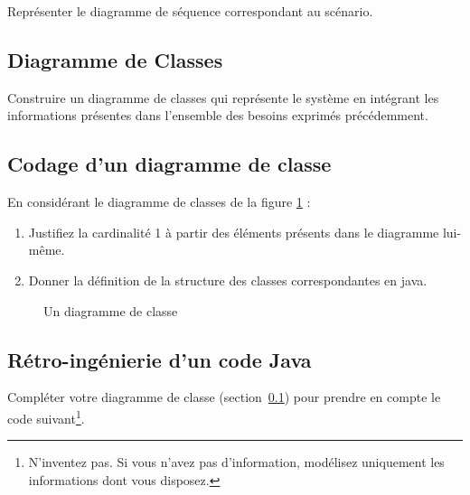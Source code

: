 \documentclass[12pt,French]{article}
\begin{document}
Représenter  le  diagramme  de  séquence  correspondant  au  scénario.

\subsection{Diagramme de Classes}\label{mondc}

Construire un diagramme de classes qui représente le système en intégrant les  informations présentes dans l'ensemble des besoins exprimés précédemment.

\subsection{Codage d'un diagramme de classe}

En considérant le diagramme de classes de la figure \ref{dc} :

\begin{enumerate}
\item Justifiez la cardinalité 1 à partir des éléments présents dans le diagramme lui-même.
\item Donner la définition de la structure des classes  correspondantes en java.
\end{enumerate}

\begin{figure}
\caption{Un diagramme de classe}\label{dc}
\end{figure}

\subsection{Rétro-ingénierie d'un code Java}

Compléter  votre  diagramme  de  classe (section~\ref{mondc}) pour  prendre  en  compte  le  code  suivant\footnote{N'inventez pas. Si vous n'avez pas d'information, modélisez uniquement les informations dont vous disposez.}.
\end{document}
